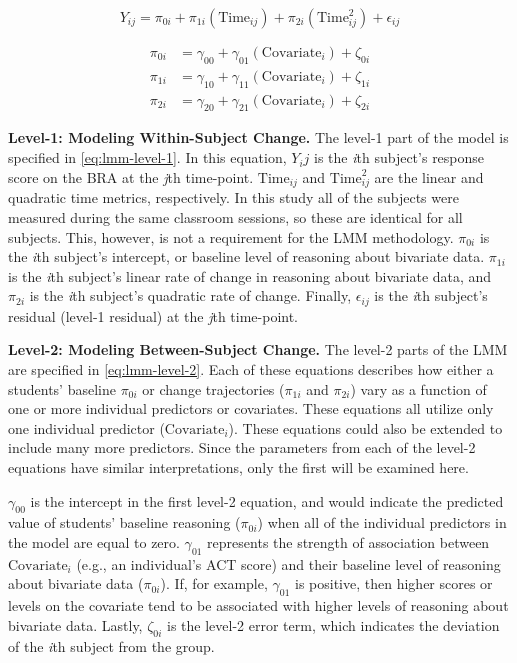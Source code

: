\documentclass[11pt]{umnthesis}
\begin{document}
\begin{equation}\label{eq:lmm-level-1}
Y_{ij} = \pi_{0i} + \pi_{1i}(\mathrm{Time}_{ij}) + \pi_{2i}(\mathrm{Time}_{ij}^2) + \epsilon_{ij}
\end{equation}

\begin{equation}\label{eq:lmm-level-2}
\begin{split}
\pi_{0i} &= \gamma_{00} + \gamma_{01}(\mathrm{Covariate}_i) + \zeta_{0i}\\[1ex]
\pi_{1i} &= \gamma_{10} + \gamma_{11}(\mathrm{Covariate}_i) + \zeta_{1i}\\[1ex]
\pi_{2i} &= \gamma_{20} + \gamma_{21}(\mathrm{Covariate}_i) + \zeta_{2i}
\end{split}
\end{equation}

\textbf{Level-1: Modeling Within-Subject Change.} The level-1 part of the model is specified in \autoref{eq:lmm-level-1}. In this equation, \(Y_ij\) is the \emph{i}th subject's response score on the BRA at the \emph{j}th time-point. \(\mathrm{Time}_{ij}\) and \(\mathrm{Time}_{ij}^2\) are the linear and quadratic time metrics, respectively. In this study all of the subjects were measured during the same classroom sessions, so these are identical for all subjects. This, however, is not a requirement for the LMM methodology. \(\pi_{0i}\) is the \emph{i}th subject's intercept, or baseline level of reasoning about bivariate data. \(\pi_{1i}\) is the \emph{i}th subject's linear rate of change in reasoning about bivariate data, and \(\pi_{2i}\) is the \emph{i}th subject's quadratic rate of change. Finally, \(\epsilon_{ij}\) is the \emph{i}th subject's residual (level-1 residual) at the \emph{j}th time-point.

\textbf{Level-2: Modeling Between-Subject Change.} The level-2 parts of the LMM are specified in \autoref{eq:lmm-level-2}. Each of these equations describes how either a students' baseline \(\pi_{0i}\) or change trajectories (\(\pi_{1i}\) and \(\pi_{2i}\)) vary as a function of one or more individual predictors or covariates. These equations all utilize only one individual predictor (\(\mathrm{Covariate}_i\)). These equations could also be extended to include many more predictors. Since the parameters from each of the level-2 equations have similar interpretations, only the first will be examined here.

\(\gamma_{00}\) is the intercept in the first level-2 equation, and would indicate the predicted value of students' baseline reasoning (\(\pi_{0i}\)) when all of the individual predictors in the model are equal to zero. \(\gamma_{01}\) represents the strength of association between \(\mathrm{Covariate}_i\) (e.g., an individual's ACT score) and their baseline level of reasoning about bivariate data (\(\pi_{0i}\)). If, for example, \(\gamma_{01}\) is positive, then higher scores or levels on the covariate tend to be associated with higher levels of reasoning about bivariate data. Lastly, \(\zeta_{0i}\) is the level-2 error term, which indicates the deviation of the \emph{i}th subject from the group.
\end{document}
